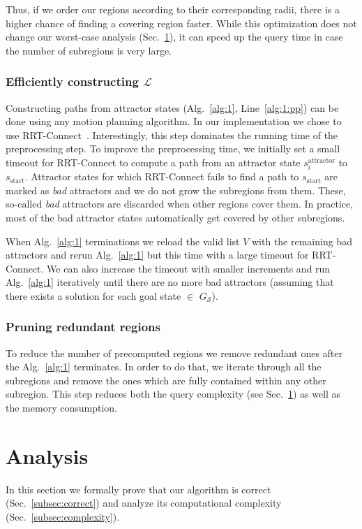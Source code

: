 \documentclass[letterpaper]{article} %
\newcommand{\calL}{\ensuremath{\mathcal{L}}\xspace}
\newcommand{\calS}{\ensuremath{\mathcal{S}}\xspace}
\newcommand{\sAttract}{\ensuremath{s^{\text{attractor}}_i}\xspace}
\newcommand{\sStart}{\ensuremath{s_{\text{start}}\xspace}}
\begin{document}
Thus, if we order our regions according to their corresponding radii, there is a higher chance of finding a covering region faster. While this optimization does not change our worst-case analysis (Sec.~\ref{sec:analysis}), it can speed up the query time in case the number of subregions is very large.

\subsubsection{Efficiently constructing $\calL$}
Constructing paths from attractor states (Alg.~\ref{alg:1}, Line~\ref{alg:1:pp}) can be done using any motion planning algorithm.
In our implementation we chose to use \textsf{RRT-Connect}~\cite{KL00}.
Interestingly, this step dominates the running time of the preprocessing step.
%
To improve the preprocessing time, we initially set a small timeout for \textsf{RRT-Connect} to compute a path from an attractor state $\sAttract$ to $\sStart$.
Attractor states for which \textsf{RRT-Connect} fails to find a path to $\sStart$ are marked as \textit{bad} attractors and we do not grow the subregions from them. 
These, so-called \textit{bad} attractors are discarded when other regions cover them.
In practice, most of the bad attractor states automatically get covered by other subregions. 

When Alg.~\ref{alg:1} terminations we reload the valid list $V$ with the remaining bad attractors and rerun Alg.~\ref{alg:1} but this time with a large timeout for \textsf{RRT-Connect}. 
%
We can also increase the timeout with smaller increments and run Alg.~\ref{alg:1} iteratively until there are no more bad attractors (assuming that there exists a solution for each goal state $\in$ $G_\calS$).


\subsubsection{Pruning redundant regions}
To reduce the number of precomputed regions we remove redundant ones after the Alg.~\ref{alg:1} terminates. 
In order to do that, we iterate through all the subregions and remove the ones which are fully contained within any other subregion. 
This step reduces both the query complexity (see Sec.~\ref{sec:analysis}) as well as the memory consumption.

\section {Analysis}
\label{sec:analysis}
In this section we formally prove that 
our algorithm is correct (Sec.~\ref{subsec:correct}) and 
analyze its computational complexity (Sec.~\ref{subsec:complexity}).
\end{document}
